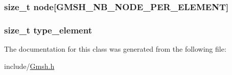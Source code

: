 \hypertarget{classGMElement_a58a0c8ba10ba9e8df5438a9b123b18f4}{
\subsubsection[{node}]{\setlength{\rightskip}{0pt plus 5cm}size\_\-t {\bf node}\mbox{[}GMSH\_\-NB\_\-NODE\_\-PER\_\-ELEMENT\mbox{]}}}
\label{d6/d49/classGMElement_a58a0c8ba10ba9e8df5438a9b123b18f4}
\hypertarget{classGMElement_abe345dc6f75e22487f04dd38647abfc1}{
\subsubsection[{type\_\-element}]{\setlength{\rightskip}{0pt plus 5cm}size\_\-t {\bf type\_\-element}}}
\label{d6/d49/classGMElement_abe345dc6f75e22487f04dd38647abfc1}


The documentation for this class was generated from the following file:\begin{DoxyCompactItemize}
\item 
include/\hyperlink{Gmsh_8h}{Gmsh.h}\end{DoxyCompactItemize}
